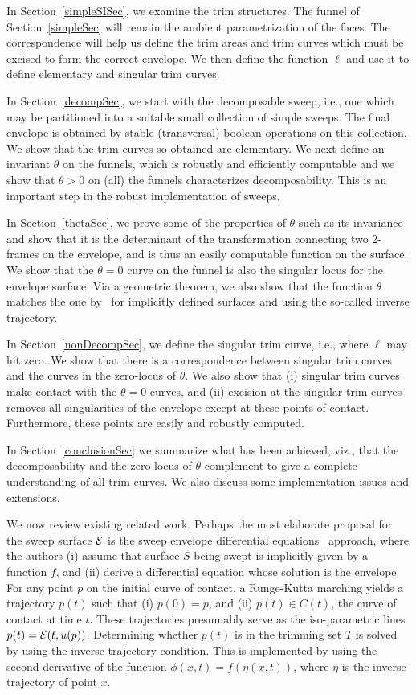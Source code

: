 \documentclass{elsart5p}
\begin{document}
In Section~\ref{simpleSISec}, we examine the trim structures. The funnel 
of Section~\ref{simpleSec} will remain the ambient parametrization of the faces. 
The correspondence will help us define the trim areas and trim curves which 
must be excised to form the correct envelope. We then define the function $\ell$ 
and use it to define elementary and singular trim curves.

In Section~\ref{decompSec}, we start with the decomposable sweep, i.e., one
which may be partitioned into
a suitable small collection of simple sweeps. The final envelope is obtained
by stable (transversal) boolean operations on this collection. We show that
the trim curves so obtained are elementary. We next define an invariant
$\theta $ on the funnels, which is robustly and efficiently computable
and we show that $\theta >0$ on (all) the funnels characterizes decomposability.
This is an important step in the robust implementation of sweeps.

In Section~\ref{thetaSec}, we prove some of the properties of $\theta $ such as 
its invariance and show that it is the determinant of the transformation
connecting two 2-frames on the envelope, and is thus an easily computable 
function on the surface. We show that the $\theta=0$
curve on the funnel is also the singular locus for the envelope surface.
Via a geometric theorem, we also show that the function $\theta $ matches
the one by~\cite{trimming}  for implicitly defined surfaces and using the so-called
inverse trajectory.

In Section~\ref{nonDecompSec}, we define the singular trim curve, i.e., where $\ell $ may
hit zero. We show that there is a correspondence between singular trim
curves and the curves in the zero-locus of $\theta $. We also show
that (i) singular trim curves make contact with the $\theta=0$ curves, and
(ii) excision at the singular trim curves removes all singularities
of the envelope except at these points of contact. Furthermore, these 
points are easily and robustly computed.

In Section~\ref{conclusionSec} we summarize what has been achieved, viz., that the
decomposability and the zero-locus of $\theta $ complement to give a complete
understanding of all trim curves. We also discuss some implementation issues
and extensions.


We now review existing related work. 
Perhaps the most elaborate proposal for the sweep surface ${\cal E}$ is the 
sweep envelope differential equations~\cite{sede} approach, where the authors 
(i) assume that surface $S$ being swept is implicitly given by a function $f$, and (ii) derive a 
differential equation whose solution 
is the envelope.  For any point $p$ on the initial curve of contact, 
a Runge-Kutta marching yields a trajectory  $p(t)$ such that (i) $p(0)=p$, 
and (ii) $p(t) \in {C}(t)$, the curve of contact at time $t$.  
These trajectories presumably serve as the iso-parametric lines $p(t)={\cal E}(t,u(p))$.  
Determining whether $p(t)$ is in the trimming set $T$ is solved by using the inverse trajectory 
condition. This is implemented by using 
the second derivative of the function $\phi(x,t) = f(\eta(x,t))$, where $\eta$ is the inverse trajectory of point $x$. 
\end{document}
